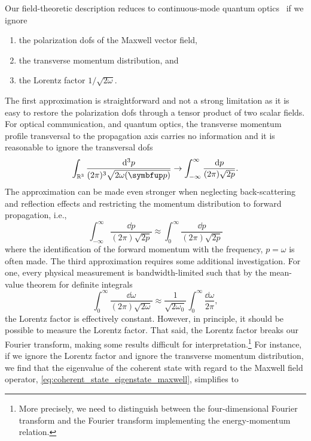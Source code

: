 Our field-theoretic description reduces to continuous-mode quantum optics~\cite{Barnett2002,Loudon2000} if we ignore
\begin{enumerate}
	\item the polarization \glspl{dof} of the Maxwell vector field,
	\item the transverse momentum distribution, and
	\item the Lorentz factor $1/\sqrt{2\omega}$.
\end{enumerate}
The first approximation is straightforward and not a strong limitation as it is easy to restore the polarization \glspl{dof} through a tensor product of two scalar fields.
For optical communication, and quantum optics, the transverse momentum profile transversal to the propagation axis carries no information and it is reasonable to ignore the transversal \glspl{dof}~\cite[p.~53]{Cohen2019}
\begin{equation}
	\int_{\mathbb{R}^3}
	\frac{\dd[3]{p}}{(2\pi)^3\sqrt{2\omega(\vb{p})}}
	\to
	\int_{-\infty}^{\infty}
	\frac{\dd{p}}{(2\pi)\sqrt{2p}}
	.
\end{equation}
The approximation can be made even stronger when neglecting back-scattering and reflection effects and restricting the momentum distribution to forward propagation, i.e.,
\begin{equation}
	\int_{-\infty}^{\infty}
	\frac{\dd{p}}{(2\pi)\sqrt{2p}}
	\approx	
	\int_{0}^{\infty}
	\frac{\dd{p}}{(2\pi)\sqrt{2p}}	
\end{equation}
where the identification of the forward momentum with the frequency, $p=\omega$ is often made.
The third approximation requires some additional investigation.
For one, every physical measurement is bandwidth-limited such that by the mean-value theorem for definite integrals
\begin{equation}
	\int_{0}^{\infty}
	\frac{\dd{\omega}}{(2\pi)\sqrt{2\omega}}
	\approx
	\frac{1}{\sqrt{2\omega_0}}
	\int_{0}^{\infty}
	\frac{\dd{\omega}}{2\pi}
	,
\end{equation}
the Lorentz factor is effectively constant.
However, in principle, it should be possible to measure the Lorentz factor.
That said, the Lorentz factor breaks our Fourier transform, making some results difficult for interpretation.\footnote{More precisely, we need to distinguish between the four-dimensional Fourier transform and the Fourier transform implementing the energy-momentum relation.}
For instance, if we ignore the Lorentz factor and ignore the transverse momentum distribution, we find that the eigenvalue of the coherent state with regard to the Maxwell field operator, \cref{eq:coherent_state_eigenstate_maxwell}, simplifies to
